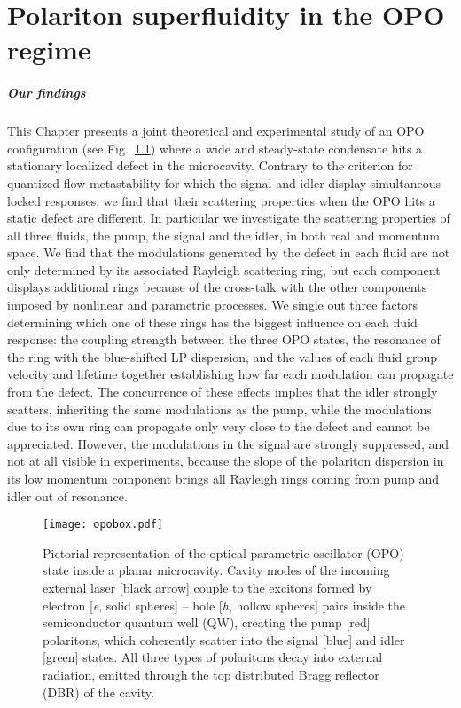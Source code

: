 

\chapter{Polariton superfluidity in the OPO regime}
\label{cha:opo}

\paragraph{Our findings}
This Chapter presents a joint theoretical and experimental study of an
OPO configuration (see Fig.~\ref{fig:opobox}) where a wide and
steady-state condensate hits a stationary localized defect in the
microcavity.  Contrary to the
criterion for quantized flow metastability for which the signal and
idler display simultaneous locked responses, we find that their
scattering properties when the OPO hits a static defect are different.
In particular we investigate the scattering properties of all three
fluids, the pump, the signal and the idler, in both real and momentum
space. We find that the modulations generated by the defect in each
fluid are not only determined by its associated Rayleigh scattering
ring, but each component displays additional rings because of the
cross-talk with the other components imposed by nonlinear and
parametric processes.  We single out three factors determining which
one of these rings has the biggest influence on each fluid response:
the coupling strength between the three OPO states, the resonance of
the ring with the blue-shifted LP dispersion, and the values of each
fluid group velocity and lifetime together establishing how far each
modulation can propagate from the defect.  The concurrence of these
effects implies that the idler strongly scatters, inheriting the same
modulations as the pump, while the modulations due to its own ring can
propagate only very close to the defect and cannot be
appreciated. However, the modulations in the signal are strongly
suppressed, and not at all visible in experiments, because the slope
of the polariton dispersion in its low momentum component brings all
Rayleigh rings coming from pump and idler out of resonance.
%
\begin{figure}[tb]\centering
  \texttt{[image: opobox.pdf]}
  \caption{
    Pictorial representation of the optical parametric oscillator
    (OPO) state inside a planar microcavity. Cavity modes of the incoming
    external laser [black arrow] couple to the excitons formed by electron
    [\textit{e}, solid spheres] -- hole [\textit{h}, hollow spheres] pairs
    inside the semiconductor quantum well (QW), creating the pump [red]
    polaritons, which coherently scatter into the signal [blue] and idler
    [green] states. All three types of polaritons decay into external
    radiation, emitted through the top distributed Bragg reflector (DBR)
    of the cavity.
  }\label{fig:opobox}
\end{figure}

